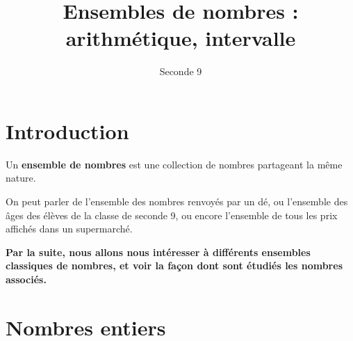 \documentclass{article}
\title{Ensembles de nombres : arithmétique, intervalle}
\date{}
\author{Seconde 9}
\begin{document}
\maketitle

\section{Introduction}
\begin{tcolorbox}
\begin{definition}
Un \textbf{ensemble de nombres} est une collection de nombres partageant la même nature.
\end{definition}
\end{tcolorbox}
\begin{example}
On peut parler de l'ensemble des nombres renvoyés par un dé, ou l'ensemble des âges des élèves de la classe de seconde 9, ou encore l'ensemble de tous les prix affichés dans un supermarché.
\end{example}
\textbf{Par la suite, nous allons nous intéresser à différents ensembles classiques de nombres, et voir la façon dont sont étudiés les nombres associés.}
\section{Nombres entiers}
\end{document}
